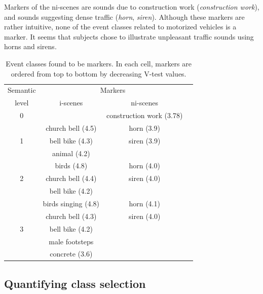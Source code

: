\documentclass[twoside,twocolumn]{article}
\begin{document}
Markers of the ni-scenes are sounds due to construction work (\textit{construction work}), and sounds suggesting dense traffic (\textit{horn}, \textit{siren}). Although these markers are rather intuitive, none of the event classes related to motorized vehicles is a marker. It seems that subjects chose to illustrate unpleasant traffic sounds using horns and sirens.

\begin{table}[t]
 \setlength{\tabcolsep}{0.2pt}
 \centering
  {\renewcommand{\arraystretch}{0.9}
\begin{tabular}{c c c c} 
Semantic   &  \multicolumn{2}{c}{Markers} \\
level & i-scenes & ni-scenes \\
\hline
0  &                                &  construction work (3.78)  \\
\hline
  & church bell  (4.5)             & horn  (3.9) \\
1   & bell bike    (4.3)             & siren (3.9)\\
   & animal       (4.2)             &       \\
   \hline
  & birds        (4.8)             & horn  (4.0)\\
2   & church bell  (4.4)             & siren (4.0)\\
   & bell bike    (4.2)             &       \\
   \hline
  & birds singing (4.8)            & horn  (4.1)\\
   & church bell   (4.3)            & siren (4.0)\\
3   & bell bike     (4.2)            &       \\
   & male footsteps                 &  \\
   &   concrete (3.6)               &  \\
  \hline
\end{tabular}
}
\vspace{0.5mm}
\caption{\label{tab:markers} Event classes found to be markers. In each cell, markers are ordered from top to bottom by decreasing V-test values.}
\end{table}

\subsection{Quantifying class selection}
\label{sec:QuantifyingClassSelection}
\end{document}
